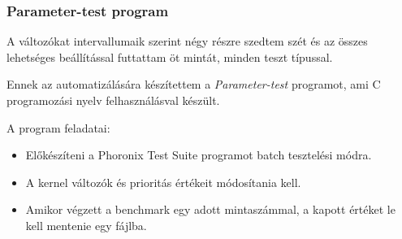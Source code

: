 \documentclass{beamer}
\begin{document}
\begin{frame}
\frametitle{Parameter-test program}
A változókat intervallumaik szerint négy részre szedtem szét és az összes lehetséges beállítással futtattam öt mintát, minden teszt típussal.

\medskip

Ennek az automatizálására készítettem a \textit{Parameter-test} programot, ami C programozási nyelv felhasználásval készült.

\bigskip

A program feladatai:
\begin{itemize}
\item Előkészíteni a Phoronix Test Suite programot batch tesztelési módra.
\item A kernel változók és prioritás értékeit módosítania kell.
\item Amikor végzett a benchmark egy adott mintaszámmal, a kapott értéket le kell mentenie egy fájlba.
\end{itemize}
\end{frame}
\end{document}
